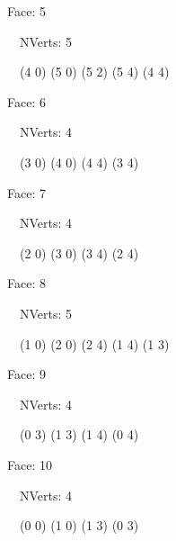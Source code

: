 \documentclass{article}
\begin{document}
    {\footnotesize

    Face: 5

    \   \    NVerts: 5

     \   \   (4 0) (5 0) (5 2) (5 4) (4 4)}

    {\footnotesize

    Face: 6

    \   \    NVerts: 4

     \   \   (3 0) (4 0) (4 4) (3 4)}

    {\footnotesize

    Face: 7

    \   \    NVerts: 4

     \   \   (2 0) (3 0) (3 4) (2 4)}

    {\footnotesize

    Face: 8

    \   \    NVerts: 5

     \   \   (1 0) (2 0) (2 4) (1 4) (1 3)}

    {\footnotesize

    Face: 9

    \   \    NVerts: 4

     \   \   (0 3) (1 3) (1 4) (0 4)}

    {\footnotesize

    Face: 10

    \   \    NVerts: 4

     \   \   (0 0) (1 0) (1 3) (0 3)}


     \newpage
\end{document}
